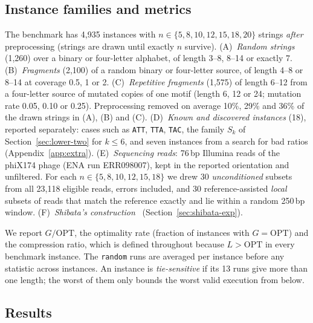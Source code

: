 \documentclass[11pt,a4paper]{article}   %
\theoremstyle{compact}
\theoremstyle{compactdef}
\newcommand{\OPT}{\mathrm{OPT}}
\newcommand{\GR}{G}                         %
\newcommand{\str}[1]{\texttt{#1}}           %
\begin{document}
\subsection{Instance families and metrics}
The benchmark has 4{,}935 instances with $n\in\{5,8,10,12,15,18,20\}$
strings \emph{after} preprocessing (strings are drawn until exactly $n$
survive).
(A)~\emph{Random strings} (1{,}260) over a binary or four-letter alphabet,
of length 3--8, 8--14 or exactly 7.
(B)~\emph{Fragments} (2{,}100) of a random binary or four-letter source, of
length 4--8 or 8--14 at coverage 0.5, 1 or 2.
(C)~\emph{Repetitive fragments} (1{,}575) of length 6--12 from a four-letter
source of mutated copies of one motif (length 6, 12 or 24; mutation rate
0.05, 0.10 or 0.25).
Preprocessing removed on average 10\%, 29\% and 36\% of the drawn strings in
(A), (B) and (C).
(D)~\emph{Known and discovered instances} (18), reported separately: cases
such as \str{ATT}, \str{TTA}, \str{TAC}, the family $S_k$ of
Section~\ref{sec:lower-two} for $k\le6$, and seven instances from a search
for bad ratios (Appendix~\ref{app:extra}).
(E)~\emph{Sequencing reads}: 76\,bp Illumina reads of the phiX174 phage
(ENA run ERR098007), kept in the reported orientation and unfiltered. For
each $n\in\{5,8,10,12,15,18\}$ we drew 30 \emph{unconditioned} subsets from all
23{,}118 eligible reads, errors included, and 30 reference-assisted
\emph{local} subsets of reads that match the reference exactly and lie within
a random 250\,bp window.
(F)~\emph{Shibata's construction}~\cite{Shi26}
(Section~\ref{sec:shibata-exp}).

We report $\GR/\OPT$, the optimality rate (fraction of instances with
$\GR=\OPT$) and the compression ratio, which is defined throughout because
$L>\OPT$ in every benchmark instance. The \texttt{random} runs are averaged per instance
before any statistic across instances. An instance is
\emph{tie-sensitive} if its 13 runs give more than one length; the worst of
them only bounds the worst valid execution from below.

\subsection{Results}
\end{document}
